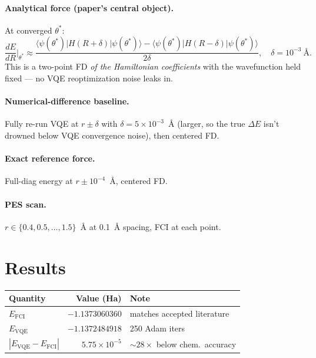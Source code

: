 \documentclass[11pt]{article}
\begin{document}
\paragraph{Analytical force (paper's central object).} At converged $\theta^{*}$:
\[
\frac{dE}{dR}\bigg|_{\theta^{*}} \approx \frac{\langle\psi(\theta^{*})|H(R{+}\delta)|\psi(\theta^{*})\rangle - \langle\psi(\theta^{*})|H(R{-}\delta)|\psi(\theta^{*})\rangle}{2\delta}, \quad \delta = 10^{-3}\ \text{\AA}.
\]
This is a two-point FD \emph{of the Hamiltonian coefficients} with the wavefunction held fixed --- no
VQE reoptimization noise leaks in.

\paragraph{Numerical-difference baseline.} Fully re-run VQE at $r\pm\delta$ with $\delta=5\times10^{-3}$~\AA{}
(larger, so the true $\Delta E$ isn't drowned below VQE convergence noise), then centered FD.

\paragraph{Exact reference force.} Full-diag energy at $r\pm10^{-4}$~\AA{}, centered FD.

\paragraph{PES scan.} $r\in\{0.4,0.5,\ldots,1.5\}$~\AA{} at 0.1~\AA{} spacing, FCI at each point.

\section{Results}
\begin{center}
\small
\begin{tabular}{lrl}
\toprule
Quantity & Value (Ha) & Note \\
\midrule
$E_{\text{FCI}}$              & $-1.1373060360$ & matches accepted literature \\
$E_{\text{VQE}}$              & $-1.1372484918$ & 250 Adam iters \\
$|E_{\text{VQE}}-E_{\text{FCI}}|$ & $5.75\times10^{-5}$ & $\sim 28\times$ below chem.\ accuracy \\
\bottomrule
\end{tabular}
\end{center}
\end{document}
